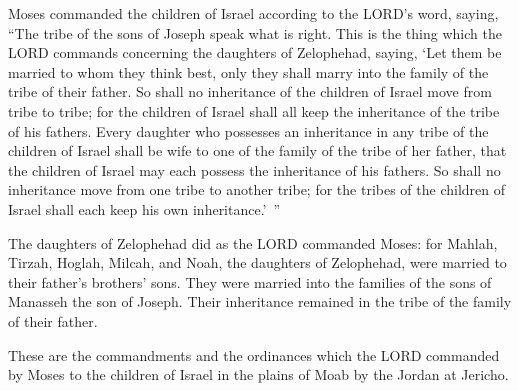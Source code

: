 \myverse{}Moses commanded the children of Israel according to the LORD’s
word, saying, “The tribe of the sons of Joseph speak what is right.
\myverse{}This is the thing which the LORD commands concerning the daughters of Zelophehad,
saying, ‘Let them be married to whom they think best, only they shall marry into the family of the tribe
of their father.
\myverse{}So shall no inheritance of the children of Israel move from tribe to tribe;
for the children of Israel shall all keep the inheritance of the tribe of his fathers.
\myverse{}Every daughter who possesses an inheritance in any tribe of the children of
Israel shall be wife to one of the family of the tribe of her father, that the children of Israel may
each possess the inheritance of his fathers.
\myverse{}So shall no inheritance move from one tribe to another tribe; for the tribes
of the children of Israel shall each keep his own inheritance.’ ”


\myverse{}The daughters of Zelophehad did as the LORD commanded Moses:
\myverse{}for Mahlah, Tirzah, Hoglah, Milcah, and Noah, the daughters of Zelophehad,
were married to their father’s brothers’ sons.
\myverse{}They were married into the families of the sons of Manasseh the son of Joseph.
Their inheritance remained in the tribe of the family of their father.


\myverse{}These are the commandments and the ordinances which the LORD
commanded by Moses to the children of Israel in the plains of Moab by the Jordan at Jericho.


